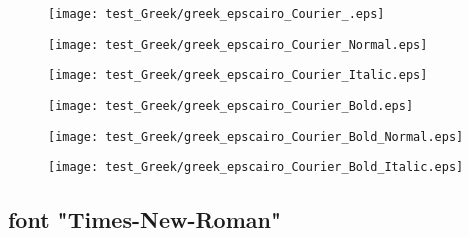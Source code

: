 \documentclass{ltjsarticle}
\begin{document}
				\begin{figure}[ht]
					\centering
					\begin{minipage}{0.3\columnwidth}
						\texttt{[image: test\_Greek/greek\_epscairo\_Courier\_.eps]}
					\end{minipage}
					\begin{minipage}{0.3\columnwidth}
						\texttt{[image: test\_Greek/greek\_epscairo\_Courier\_Normal.eps]}
					\end{minipage}
					\begin{minipage}{0.3\columnwidth}
						\texttt{[image: test\_Greek/greek\_epscairo\_Courier\_Italic.eps]}
					\end{minipage}
					\begin{minipage}{0.3\columnwidth}
						\texttt{[image: test\_Greek/greek\_epscairo\_Courier\_Bold.eps]}
					\end{minipage}
					\begin{minipage}{0.3\columnwidth}
						\texttt{[image: test\_Greek/greek\_epscairo\_Courier\_Bold\_Normal.eps]}
					\end{minipage}
					\begin{minipage}{0.3\columnwidth}
						\texttt{[image: test\_Greek/greek\_epscairo\_Courier\_Bold\_Italic.eps]}
					\end{minipage}
				\end{figure}
				\clearpage%

		\subsection{font "Times-New-Roman"}
\end{document}
